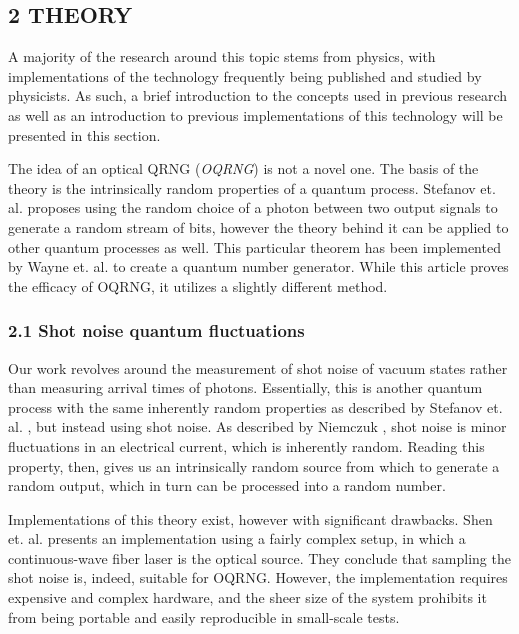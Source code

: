 \documentclass{sigchi}
\begin{document}
\subsection{2 THEORY}\label{theory}

A majority of the research around this topic stems from physics, with implementations of the technology frequently being published and studied by physicists. As such, a brief introduction to the concepts used in previous research as well as an introduction to previous implementations of this technology will be presented in this section.

The idea of an optical QRNG (\emph{OQRNG}) is not a novel one. The basis of the theory is the intrinsically random properties of a quantum process. Stefanov et. al. \cite{StefanovOptical} proposes using the random choice of a photon between two output signals to generate a random stream of bits, however the theory behind it can be applied to other quantum processes as well. This particular theorem has been implemented by Wayne et. al. \cite{Wayne} to create a quantum number generator. While this article proves the efficacy of OQRNG, it utilizes a slightly different method.

\subsubsection{2.1 Shot noise quantum fluctuations}\label{shot-noise-quantum-fluctuations}

Our work revolves around the measurement of shot noise of vacuum states rather than measuring arrival times of photons. Essentially, this is another quantum process with the same inherently random properties as described by Stefanov et. al. \cite{StefanovOptical}, but instead using shot noise. As described by Niemczuk \cite{shotnoise}, shot noise is minor fluctuations in an electrical current, which is inherently random. Reading this property, then, gives us an intrinsically random source from which to generate a random output, which in turn can be processed into a random number.

Implementations of this theory exist, however with significant drawbacks. Shen et. al. \cite{contender1} presents an implementation using a fairly complex setup, in which a continuous-wave fiber laser is the optical source. They conclude that sampling the shot noise is, indeed, suitable for OQRNG. However, the implementation requires expensive and complex hardware, and the sheer size of the system prohibits it from being portable and easily reproducible in small-scale tests.
\end{document}
